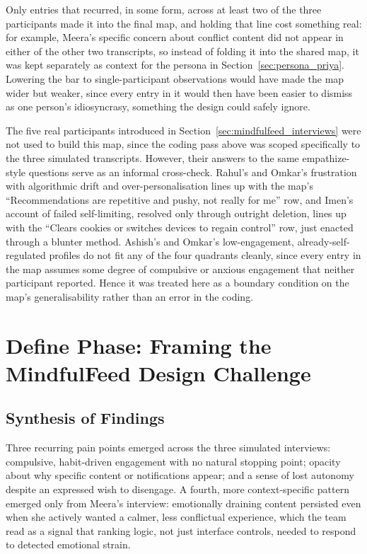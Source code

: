 \documentclass[11pt]{article}
\begin{document}
Only entries that recurred, in some form, across at least two of the three participants made it into the final map, and holding that line cost something real: for example, Meera's specific concern about conflict content did not appear in either of the other two transcripts, so instead of folding it into the shared map, it was kept separately as context for the persona in Section~\ref{sec:persona_priya}. Lowering the bar to single-participant observations would have made the map wider but weaker, since every entry in it would then have been easier to dismiss as one person's idiosyncrasy, something the design could safely ignore.

The five real participants introduced in Section~\ref{sec:mindfulfeed_interviews} were not used to build this map, since the coding pass above was scoped specifically to the three simulated transcripts. However, their answers to the same empathize-style questions serve as an informal cross-check. Rahul's and Omkar's frustration with algorithmic drift and over-personalisation lines up with the map's ``Recommendations are repetitive and pushy, not really for me'' row, and Imen's account of failed self-limiting, resolved only through outright deletion, lines up with the ``Clears cookies or switches devices to regain control'' row, just enacted through a blunter method. Ashish's and Omkar's low-engagement, already-self-regulated profiles do not fit any of the four quadrants cleanly, since every entry in the map assumes some degree of compulsive or anxious engagement that neither participant reported. Hence it was treated here as a boundary condition on the map's generalisability rather than an error in the coding.

\section{Define Phase: Framing the MindfulFeed Design Challenge}

\subsection{Synthesis of Findings}
Three recurring pain points emerged across the three simulated interviews: compulsive, habit-driven engagement with no natural stopping point; opacity about why specific content or notifications appear; and a sense of lost autonomy despite an expressed wish to disengage. A fourth, more context-specific pattern emerged only from Meera's interview: emotionally draining content persisted even when she actively wanted a calmer, less conflictual experience, which the team read as a signal that ranking logic, not just interface controls, needed to respond to detected emotional strain.
\end{document}

